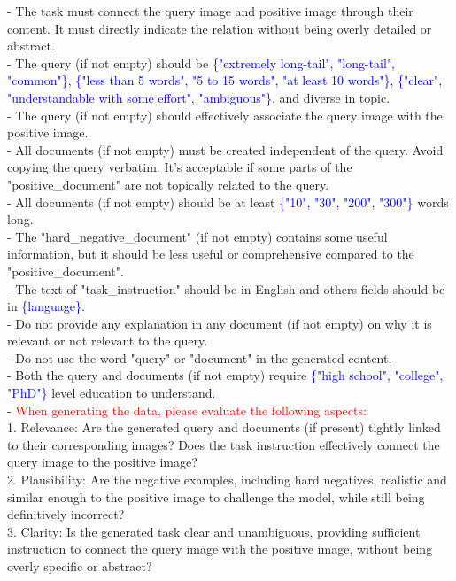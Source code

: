 \begin{figure*}[t]
\begin{prompt}[title={Prompt: Synthesizing Retrieval Data (With Document Images)}, label=prompt:ret_three_image]
- The task must connect the query image and positive image through their content. It must directly indicate the relation without being overly detailed or abstract.\\
- The query (if not empty) should be \textcolor{blue}{\{"extremely long-tail", "long-tail", "common"\}}, \textcolor{blue}{\{"less than 5 words", "5 to 15 words", "at least 10 words"\}}, \textcolor{blue}{\{"clear", "understandable with some effort", "ambiguous"\}}, and diverse in topic.\\
- The query (if not empty) should effectively associate the query image with the positive image. \\
- All documents (if not empty) must be created independent of the query. Avoid copying the query verbatim. It’s acceptable if some parts of the "positive\_document" are not topically related to the query.\\
- All documents (if not empty) should be at least \textcolor{blue}{\{"10", "30", "200", "300"\}} words long.\\
- The "hard\_negative\_document" (if not empty) contains some useful information, but it should be less useful or comprehensive compared to the "positive\_document".\\
- The text of "task\_instruction" should be in English and others fields should be in \textcolor{blue}{\{language\}}.\\
- Do not provide any explanation in any document (if not empty) on why it is relevant or not relevant to the query.\\
- Do not use the word "query" or "document" in the generated content.\\
- Both the query and documents (if not empty) require \textcolor{blue}{\{"high school", "college", "PhD"\}} level education to understand.\\
- \textcolor{red}{When generating the data, please evaluate the following aspects:}\\
  1. Relevance: Are the generated query and documents (if present) tightly linked to their corresponding images? Does the task instruction effectively connect the query image to the positive image?\\
  2. Plausibility: Are the negative examples, including hard negatives, realistic and similar enough to the positive image to challenge the model, while still being definitively incorrect?\\
  3. Clarity: Is the generated task clear and unambiguous, providing sufficient instruction to connect the query image with the positive image, without being overly specific or abstract?\\

\end{prompt}
\end{figure*}

